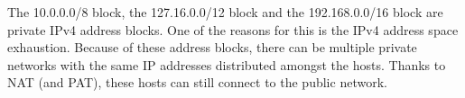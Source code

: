 The 10.0.0.0/8 block, the 127.16.0.0/12 block and the 192.168.0.0/16 block are private IPv4 address blocks. One of the reasons for this is the IPv4 address space exhaustion. Because of these address blocks, there can be multiple private networks with the same IP addresses distributed amongst the hosts. Thanks to NAT (and PAT), these hosts can still connect to the public network.